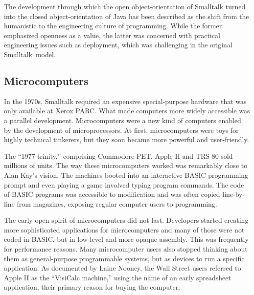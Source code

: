 The development through which the open object-orientation of Smalltalk turned into
the closed object-orientation of Java has been described as the shift from the humanistic to the
engineering culture of programming. While the former emphasized
openness as a value, the latter was concerned with practical engineering issues such as
deployment, which was challenging in the original Smalltalk~model.


\subsection{Microcomputers}
In the 1970s, Smalltalk required an expensive special-purpose hardware that was
only available at Xerox PARC. What made computers more widely accessible
was a parallel development.
Microcomputers were a new kind of computers enabled by the development of
microprocessors. At first, microcomputers were
toys for highly technical tinkerers, but they soon became more powerful and user-friendly.

The ``1977 trinity,'' comprising Commodore PET, Apple II and TRS-80 sold millions of units.
The way these microcomputers worked was
remarkably close to Alan Kay's vision.
The machines booted into an
interactive BASIC programming prompt and even playing a game involved typing program
commands. The code of BASIC programs was accessible to modification and was often copied
line-by-line from magazines, exposing regular computer users to programming.

The early open spirit of microcomputers did not last. Developers started
creating more sophisticated applications for microcomputers and many of those were not coded in
BASIC, but in low-level and more opaque assembly. This was frequently for performance reasons.
Many microcomputer users also stopped thinking about them as general-purpose programmable systems, but
as devices to run a specific application. As documented by Laine
Nooney, the Wall Street users referred to Apple II
as the ``VisiCalc machine,'' using the name of an early spreadsheet application, their primary
reason for buying the computer.

